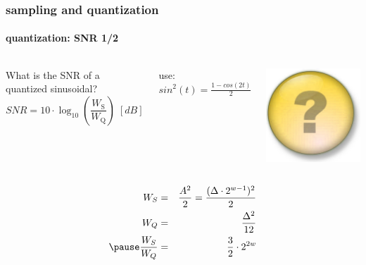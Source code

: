	\begin{frame}\frametitle{sampling and quantization}\framesubtitle{quantization: SNR 1/2}
		\vspace{-5mm}
		\begin{columns}
			\column{6cm}
			What is the SNR of a quantized sinusoidal?
			\begin{equation}\nonumber
				SNR = 10\cdot\log_{10}\left(\frac{W_{\mathrm{S}}}{W_{\mathrm{Q}}}\right)\; [dB] 
			\end{equation}
			
			\hspace{3mm}use: $sin^2(t) = \frac{1-cos(2t)}{2}$
			
			\column{4cm}
			\begin{flushright}
				 \includegraphics[scale=.08]{Graph/question-mark}
			\end{flushright}
		\end{columns}
		
		\pause
		\begin{eqnarray}
			W_S &=& \frac{A^2}{2} = \frac{(\Delta\cdot 2^{w-1})^2}{2}\\
			W_Q &=& \frac{\Delta^2}{12}\\
			\pause
			\frac{W_S}{W_Q} &=& \frac{3}{2}\cdot 2^{2w}
		\end{eqnarray}
	\end{frame}		
